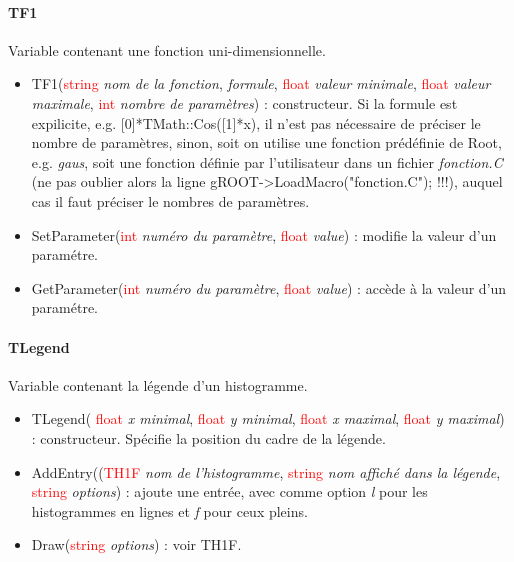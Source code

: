 \documentclass[a4paper]{report}
\begin{document}
\paragraph{TF1}
Variable contenant une fonction uni-dimensionnelle.
  \begin{itemize}
   \item TF1(\textcolor{red}{string} \textit{nom de la fonction}, \textit{formule}, \textcolor{red}{float} \textit{valeur minimale}, \textcolor{red}{float} \textit{valeur maximale}, \textcolor{red}{int} \textit{nombre de param\`{e}tres}) : constructeur. Si la formule est expilicite, e.g. [0]*TMath::Cos([1]*x), il n'est pas n\'{e}cessaire de pr\'{e}ciser le nombre de param\`{e}tres, sinon, soit on utilise une fonction pr\'{e}d\'{e}finie de Root, e.g. \textit{gaus}, soit une fonction d\'{e}finie par l'utilisateur dans un fichier \textit{fonction.C} (ne pas oublier alors la ligne gROOT->LoadMacro("fonction.C"); !!!), auquel cas il faut pr\'{e}ciser le nombres de param\`{e}tres.
   \item SetParameter(\textcolor{red}{int} \textit{num\'{e}ro du param\`{e}tre}, \textcolor{red}{float} \textit{value}) : modifie la valeur d'un param\'{e}tre.
    \item GetParameter(\textcolor{red}{int} \textit{num\'{e}ro du param\`{e}tre}, \textcolor{red}{float} \textit{value}) : acc\`{e}de \`{a} la valeur d'un param\'{e}tre.
  \end{itemize}


\paragraph{TLegend}
Variable contenant la l\'{e}gende d'un histogramme.
  \begin{itemize}
   \item TLegend( \textcolor{red}{float} \textit{x minimal},  \textcolor{red}{float} \textit{y minimal},  \textcolor{red}{float} \textit{x maximal},  \textcolor{red}{float} \textit{y maximal}) : constructeur. Sp\'{e}cifie la position du cadre de la l\'{e}gende.
   \item AddEntry((\textcolor{red}{TH1F} \textit{nom de l'histogramme}, \textcolor{red}{string} \textit{nom affich\'{e} dans la l\'{e}gende}, \textcolor{red}{string} \textit{options}) : ajoute une entr\'{e}e, avec comme option \textit{l} pour les histogrammes en lignes et \textit{f} pour ceux pleins.
   \item Draw(\textcolor{red}{string} \textit{options}) : voir TH1F.
  \end{itemize}
\end{document}
